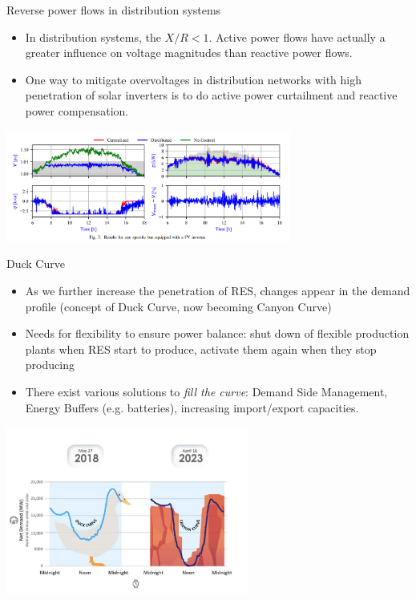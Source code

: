 \begin{frame}{Reverse power flows in distribution systems}
\begin{itemize}
    \item In distribution systems, the $X/R < 1$. Active power flows have actually a greater influence on voltage magnitudes than reactive power flows.
    \item One way to mitigate overvoltages in distribution networks with high penetration of solar inverters is to do active power curtailment and reactive power compensation.
\end{itemize}
\begin{center}
\includegraphics[width=0.7\textwidth]{images/VoltageCtrl.png}
\end{center}
\end{frame}

\begin{frame}{Duck Curve}
\begin{itemize}
    \item As we further increase the penetration of RES, changes appear in the demand profile (concept of Duck Curve, now becoming Canyon Curve)
    \item Needs for flexibility to ensure power balance: shut down of flexible production plants when RES start to produce, activate them again when they stop producing
    \item There exist various solutions to \emph{fill the curve}: Demand Side Management, Energy Buffers (e.g. batteries), increasing import/export capacities.
\end{itemize}
\begin{center}
\includegraphics[width=0.6\textwidth]{images/duckcurve.png}
\end{center}
\end{frame}




